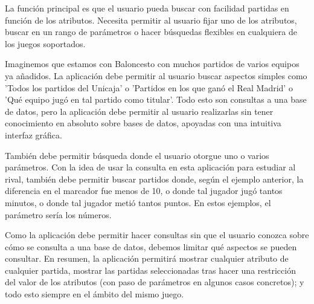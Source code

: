 La función principal es que el usuario pueda buscar con facilidad partidas en función de los atributos. Necesita permitir al usuario fijar uno de los atributos, buscar en un rango de parámetros o hacer búsquedas flexibles en cualquiera de los juegos soportados.

Imaginemos que estamos con Baloncesto con muchos partidos de varios equipos ya añadidos. La aplicación debe permitir al usuario buscar aspectos simples como 'Todos los partidos del Unicaja' o 'Partidos en los que ganó el Real Madrid' o 'Qué equipo jugó en tal partido como titular'. Todo esto son consultas a una base de datos, pero la aplicación debe permitir al usuario realizarlas sin tener conocimiento en absoluto sobre bases de datos, apoyadas con una intuitiva interfaz gráfica. 

También debe permitir búsqueda donde el usuario otorgue uno o varios parámetros. Con la idea de usar la consulta en esta aplicación para estudiar al rival, también debe permitir buscar partidos donde, según el ejemplo anterior, la diferencia en el marcador fue menos de 10, o donde tal jugador jugó tantos minutos, o donde tal jugador metió tantos puntos. En estos ejemplos, el parámetro sería los números.

Como la aplicación debe permitir hacer consultas sin que el usuario conozca sobre cómo se consulta a una base de datos, debemos limitar qué aspectos se pueden consultar. En resumen, la aplicación permitirá mostrar cualquier atributo de cualquier partida, mostrar las partidas seleccionadas tras hacer una restricción del valor de los atributos (con paso de parámetros en algunos casos concretos); y todo esto siempre en el ámbito del mismo juego.